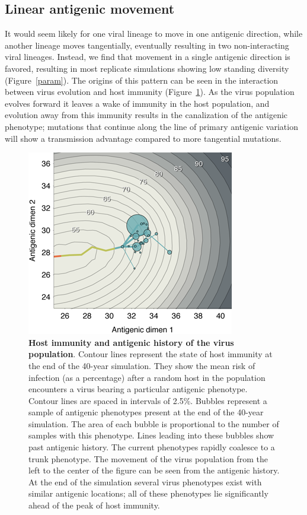 \documentclass[11pt,oneside,letterpaper]{article}
\begin{document}
\subsection*{Linear antigenic movement}

It would seem likely for one viral lineage to move in one antigenic direction, while another lineage moves tangentially, eventually resulting in two non-interacting viral lineages.  Instead, we find that movement in a single antigenic direction is favored, resulting in most replicate simulations showing low standing diversity (Figure~\ref{param}).  The origins of this pattern can be seen in the interaction between virus evolution and host immunity (Figure~\ref{immunity}).  As the virus population evolves forward it leaves a wake of immunity in the host population, and evolution away from this immunity results in the canalization of the antigenic phenotype; mutations that continue along the line of primary antigenic variation will show a transmission advantage compared to more tangential mutations.  

\begin{figure}[tb]
	\centering
	\includegraphics{figures/immunity}
	\caption{\textbf{Host immunity and antigenic history of the virus population}.  Contour lines represent the state of host immunity at the end of the 40-year simulation.  They show the mean risk of infection (as a percentage) after a random host in the population encounters a virus bearing a particular antigenic phenotype.  Contour lines are spaced in intervals of 2.5\%. Bubbles represent a sample of antigenic phenotypes present at the end of the 40-year simulation.  The area of each bubble is proportional to the number of samples with this phenotype.  Lines leading into these bubbles show past antigenic history.  The current phenotypes rapidly coalesce to a trunk phenotype.  The movement of the virus population from the left to the center of the figure can be seen from the antigenic history.  At the end of the simulation several virus phenotypes exist with similar antigenic locations; all of these phenotypes lie significantly ahead of the peak of host immunity.}
	\label{immunity}
\end{figure}
\end{document}
